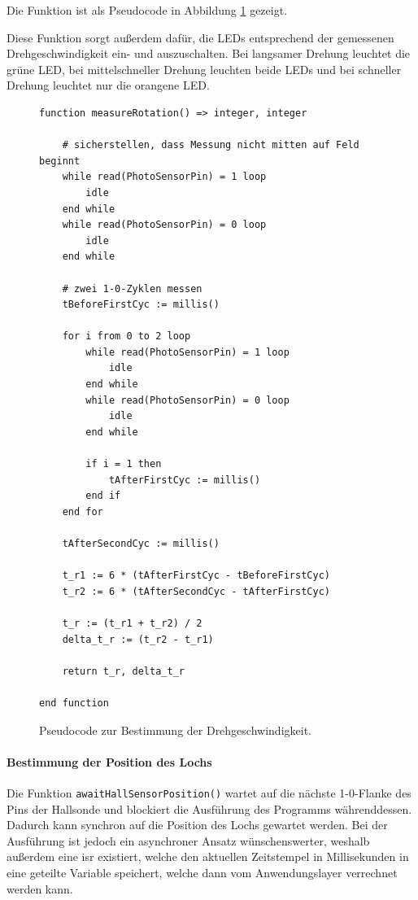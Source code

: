 \documentclass{kis}
\begin{document}
Die Funktion ist als Pseudocode in Abbildung \ref{fig:pseudo-dreh} gezeigt.

Diese Funktion sorgt außerdem dafür, die LEDs entsprechend der gemessenen Drehgeschwindigkeit ein- und auszuschalten. Bei langsamer Drehung leuchtet die grüne LED, bei mittelschneller Drehung leuchten beide LEDs und bei schneller Drehung leuchtet nur die orangene LED.

\begin{figure}[H]
\lstset{basicstyle=\small\ttfamily,tabsize=4}
{\singlespacing
\begin{lstlisting}[frame=single]
function measureRotation() => integer, integer

	# sicherstellen, dass Messung nicht mitten auf Feld beginnt
	while read(PhotoSensorPin) = 1 loop
		idle
	end while
	while read(PhotoSensorPin) = 0 loop
		idle
	end while

	# zwei 1-0-Zyklen messen
	tBeforeFirstCyc := millis()

	for i from 0 to 2 loop
		while read(PhotoSensorPin) = 1 loop
			idle
		end while
		while read(PhotoSensorPin) = 0 loop
			idle
		end while
		
		if i = 1 then
			tAfterFirstCyc := millis()
		end if
	end for	
	
	tAfterSecondCyc := millis()
	
	t_r1 := 6 * (tAfterFirstCyc - tBeforeFirstCyc)
	t_r2 := 6 * (tAfterSecondCyc - tAfterFirstCyc)
	
	t_r := (t_r1 + t_r2) / 2
	delta_t_r := (t_r2 - t_r1)
	
	return t_r, delta_t_r
	
end function
\end{lstlisting}
}
\caption{Pseudocode zur Bestimmung der Drehgeschwindigkeit.}
\label{fig:pseudo-dreh}
\end{figure}
\fi

\paragraph{Bestimmung der Position des Lochs}
Die Funktion \texttt{awaitHallSensorPosition()} wartet auf die nächste 1-0-Flanke des Pins der Hallsonde und blockiert die Ausführung des Programms währenddessen. Dadurch kann synchron auf die Position des Lochs gewartet werden. Bei der Ausführung ist jedoch ein asynchroner Ansatz wünschenswerter, weshalb außerdem eine \gls{isr} existiert, welche den aktuellen Zeitstempel in Millisekunden in eine geteilte Variable speichert, welche dann vom Anwendungslayer verrechnet werden kann.
\end{document}
